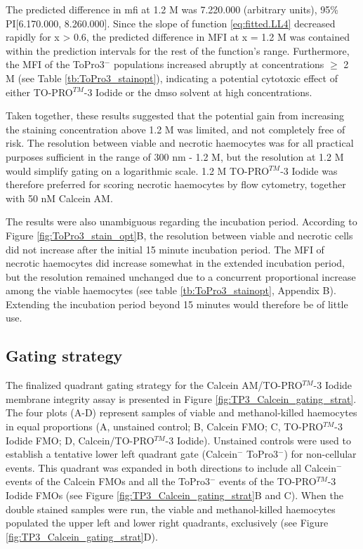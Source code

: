 The predicted difference in \acrshort{mfi} at 1.2 \micro M was 7.220.000 (arbitrary units), 95\% PI[6.170.000, 8.260.000]. Since the slope of function \ref{eq:fitted.LL4} decreased rapidly for x > 0.6, the predicted difference in MFI at x = 1.2 \micro M was contained within the prediction intervals for the rest of the function's range. Furthermore, the MFI of the ToPro3$^{-}$ populations increased abruptly at concentrations $\geq$ 2 \micro M (see Table \ref{tb:ToPro3_stainopt}), indicating a potential cytotoxic effect of either TO-PRO$^{TM}$-3 Iodide or the \acrshort{dmso} solvent at high concentrations.

Taken together, these results suggested that the potential gain from increasing the staining concentration above 1.2 \micro M was limited, and not completely free of risk. The resolution between viable and necrotic haemocytes was for all practical purposes sufficient in the range of 300 nm - 1.2 \micro M, but the resolution at 1.2 \micro M would simplify gating on a logarithmic scale. 1.2 \micro M TO-PRO$^{TM}$-3 Iodide was therefore preferred for scoring necrotic haemocytes by flow cytometry, together with 50 nM Calcein AM.

The results were also unambiguous regarding the incubation period. According to Figure \ref{fig:ToPro3_stain_opt}B, the resolution between viable and necrotic cells did not increase after the initial 15 minute incubation period. The MFI of necrotic haemocytes did increase somewhat in the extended incubation period, but the resolution remained unchanged due to a concurrent proportional increase among the viable haemocytes (see table \ref{tb:ToPro3_stainopt}, Appendix B). Extending the incubation period beyond 15 minutes would therefore be of little use.

\subsection{Gating strategy}
The finalized quadrant gating strategy for the Calcein AM/TO-PRO$^{TM}$-3 Iodide membrane integrity assay is presented in Figure \ref{fig:TP3_Calcein_gating_strat}. The four plots (A-D) represent samples of viable and methanol-killed haemocytes in equal proportions (A, unstained control; B, Calcein FMO; C, TO-PRO$^{TM}$-3 Iodide FMO; D, Calcein/TO-PRO$^{TM}$-3 Iodide). Unstained controls were used to establish a tentative lower left quadrant gate (Calcein$^{-}$ ToPro3$^{-}$) for non-cellular events. This quadrant was expanded in both directions to include all Calcein$^{-}$ events of the Calcein FMOs and all the ToPro3$^{-}$ events of the TO-PRO$^{TM}$-3 Iodide FMOs (see Figure \ref{fig:TP3_Calcein_gating_strat}B and C). When the double stained samples were run, the viable and methanol-killed haemocytes populated the upper left and lower right quadrants, exclusively (see Figure \ref{fig:TP3_Calcein_gating_strat}D).

